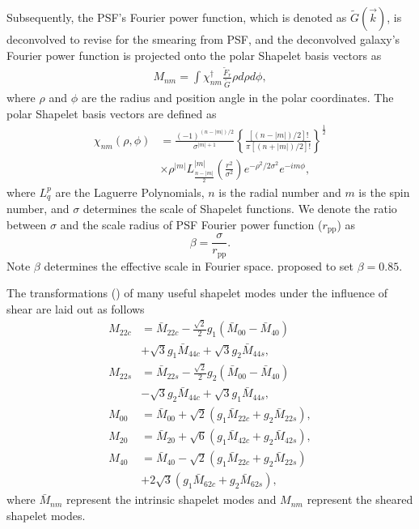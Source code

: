 Subsequently, the PSF's Fourier power function, which is denoted as
$\tilde{G}(\vec{k})$, is deconvolved to revise for the smearing from PSF, and
the deconvolved galaxy's Fourier power function is projected onto the polar
Shapelet basis vectors \citep{polar_Shapelets} as
\begin{align}\label{Shapelets_decompose}
M_{nm}=\int \chi_{nm}^\dagger \frac{\tilde{F}_r}{\tilde{G}}\rho d\rho d\phi,
\end{align}
where $\rho$ and $\phi$ are the radius and position angle in the polar
coordinates. The polar Shapelet basis vectors are defined as
\begin{align*}
\chi_{nm}(\rho,\phi)&=\frac{(-1)^{(n-|m|)/2}}{\sigma^{|m|+1}}\left\lbrace
    \frac{[(n-|m|)/2]!}{\pi[(n+|m|)/2]!}\right\rbrace^\frac{1}{2}\\
    &\times
    \rho^{|m|}L^{|m|}_{\frac{n-|m|}{2}}\left(\frac{r^2}{\sigma^2}\right)e^{-\rho^2/2\sigma^2}
    e^{-im\phi},
\end{align*}
where $L^{p}_{q}$ are the Laguerre Polynomials, $n$ is the radial number and
$m$ is the spin number, and $\sigma$ determines the scale of Shapelet
functions. We denote the ratio between $\sigma$ and the scale radius of PSF
Fourier power function ($r_{\text{pp}}$) as \citep{FPFS-Li2018}
\begin{equation}
\beta=\frac{\sigma}{r_{\text{pp}}}.
\end{equation}
Note $\beta$ determines the effective scale in Fourier space.
\citet{FPFS-Li2018} proposed to set $\beta=0.85$.

The transformations (\citep{polar_Shapelets}) of many useful shapelet modes
under the influence of shear are laid out as follows
\begin{equation}\label{Shapelets_Moments_shear_Transform}
\begin{split}
M_{22c}&=\bar{M}_{22c}-\frac{\sqrt{2}}{2}g_1(\bar{M}_{00}-\bar{M}_{40})\\
&+\sqrt{3}g_1 \bar{M}_{44c}+\sqrt{3} g_2 \bar{M}_{44s},\\
M_{22s}&=\bar{M}_{22s}-\frac{\sqrt{2}}{2}g_2(\bar{M}_{00}-\bar{M}_{40})\\
&-\sqrt{3}g_2 \bar{M}_{44c}+\sqrt{3} g_1 \bar{M}_{44s},\\
M_{00} &=\bar{M}_{00}+\sqrt{2}(g_1\bar{M}_{22c}+g_2\bar{M}_{22s}),\\
M_{20} &=\bar{M}_{20}+\sqrt{6}(g_1\bar{M}_{42c}+g_2\bar{M}_{42s}),\\
M_{40} &=\bar{M}_{40}-\sqrt{2}(g_1\bar{M}_{22c}+g_2\bar{M}_{22s})\\
&+2\sqrt{3}(g_1\bar{M}_{62c}+g_2\bar{M}_{62s}),
\end{split}
\end{equation}
where $\bar{M}_{nm}$ represent the intrinsic shapelet modes and $M_{nm}$
represent the sheared shapelet modes.

